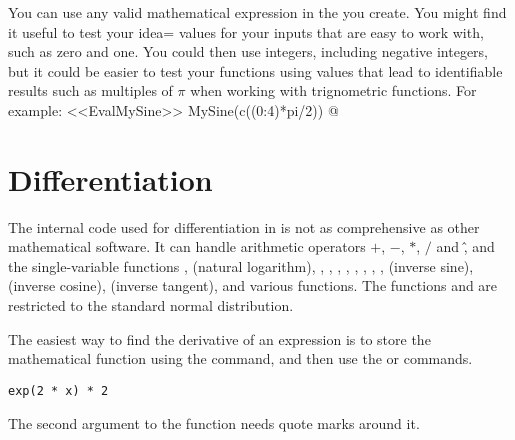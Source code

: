 You can use any valid mathematical expression in the  you create. You might find it useful to test your idea= values for your inputs that are easy to work with, such as zero and one. You could then use integers, including negative integers, but  it could be easier to test your functions using values that lead to identifiable results such as multiples of $\pi$ when working with trignometric functions. For example: 
<<EvalMySine>> 
MySine(c((0:4)*pi/2)) 
@ 
 
 
 
\section{Differentiation} 
 
The internal code used for differentiation in \R{} is not as comprehensive as other mathematical software. 
It can handle arithmetic operators $+$, $-$, $*$, $/$ and \^, and the single-variable functions ,  (natural logarithm), , , , , , , , 
,  (inverse sine),  (inverse cosine),  (inverse tangent), and various  functions. The functions  and  are restricted to the standard normal distribution. 
 
The easiest way to find the derivative of an expression is to store the mathematical function using the  command, and then use the  or  commands. 
\begin{knitrout}
\color{fgcolor}\begin{kframe}
\begin{alltt}
\hlstd{> }\hlkwb{=}\hlstd{(}\hlstd{(}\hlopt{*}
\hlstd{> }\hlstd{)}
\end{alltt}
\begin{verbatim}
exp(2 * x) * 2
\end{verbatim}
\end{kframe}
\end{knitrout}
The second argument to the  function needs quote marks around it. 
 


